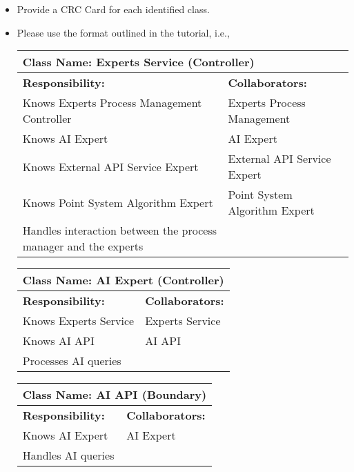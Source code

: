 \documentclass[]{article}
\begin{document}
\begin{itemize}
    \item Provide a CRC Card for each identified class.
    \item Please use the format outlined in the tutorial, i.e., 
    \begin{table}[H]
        \centering
        \begin{tabular}{|p{5cm}|p{5cm}|}
        \hline 
         \multicolumn{2}{|l|}{\textbf{Class Name: Experts Service (Controller)}} \\
        \hline
        \textbf{Responsibility:} & \textbf{Collaborators:} \\
        \hline
        Knows Experts Process Management Controller & Experts Process Management \\
        Knows AI Expert & AI Expert \\
        Knows External API Service Expert & External API Service Expert \\
        Knows Point System Algorithm Expert & Point System Algorithm Expert \\
        Handles interaction between the process manager and the experts & \\
        \hline
        \end{tabular}
    \end{table}
    
    \begin{table}[H]
        \centering
        \begin{tabular}{|p{5cm}|p{5cm}|}
        \hline 
         \multicolumn{2}{|l|}{\textbf{Class Name: AI Expert (Controller)}} \\
        \hline
        \textbf{Responsibility:} & \textbf{Collaborators:} \\
        \hline
        Knows Experts Service & Experts Service \\
        Knows AI API & AI API \\
        Processes AI queries & \\
        \hline
        \end{tabular}
    \end{table}
    
    \begin{table}[H]
        \centering
        \begin{tabular}{|p{5cm}|p{5cm}|}
        \hline 
         \multicolumn{2}{|l|}{\textbf{Class Name: AI API (Boundary)}} \\
        \hline
        \textbf{Responsibility:} & \textbf{Collaborators:} \\
        \hline
        Knows AI Expert & AI Expert \\
        Handles AI queries & \\
        \hline
        \end{tabular}
    \end{table}
    

\end{itemize}
\end{document}
